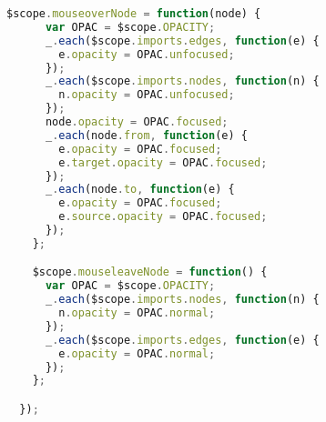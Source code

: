\begin{lstlisting}[language=JavaScript]
    $scope.mouseoverNode = function(node) {
      var OPAC = $scope.OPACITY;
      _.each($scope.imports.edges, function(e) {
        e.opacity = OPAC.unfocused;
      });
      _.each($scope.imports.nodes, function(n) {
        n.opacity = OPAC.unfocused;
      });
      node.opacity = OPAC.focused;
      _.each(node.from, function(e) {
        e.opacity = OPAC.focused;
        e.target.opacity = OPAC.focused;
      });
      _.each(node.to, function(e) {
        e.opacity = OPAC.focused;
        e.source.opacity = OPAC.focused;
      });
    };

    $scope.mouseleaveNode = function() {
      var OPAC = $scope.OPACITY;
      _.each($scope.imports.nodes, function(n) {
        n.opacity = OPAC.normal;
      });
      _.each($scope.imports.edges, function(e) {
        e.opacity = OPAC.normal;
      });
    };

  });
\end{lstlisting}

